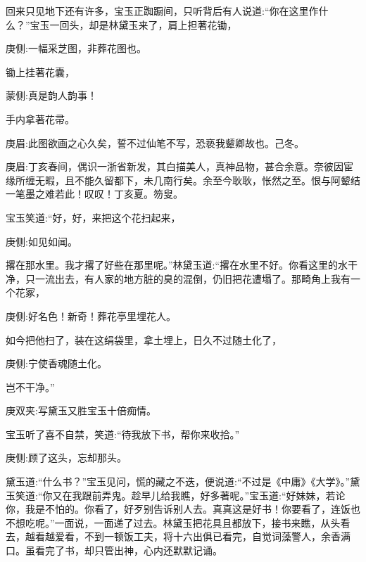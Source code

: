 \begin{parag}
    回来只见地下还有许多，宝玉正踟蹰间，只听背后有人说道:“你在这里作什么？”宝玉一回头，却是林黛玉来了，肩上担著花锄，\begin{note}庚侧:一幅采芝图，非葬花图也。\end{note}锄上挂著花囊，\begin{note}蒙侧:真是韵人韵事！\end{note}手内拿著花帚。\begin{note}庚眉:此图欲画之心久矣，誓不过仙笔不写，恐亵我颦卿故也。己冬。\end{note}\begin{note}庚眉:丁亥春间，偶识一浙省新发，其白描美人，真神品物，甚合余意。奈彼因宦缘所缠无暇，且不能久留都下，未几南行矣。余至今耿耿，怅然之至。恨与阿颦结一笔墨之难若此！叹叹！丁亥夏。笏叟。\end{note}宝玉笑道:“好，好，来把这个花扫起来，\begin{note}庚侧:如见如闻。\end{note}撂在那水里。我才撂了好些在那里呢。”林黛玉道:“撂在水里不好。你看这里的水干净，只一流出去，有人家的地方脏的臭的混倒，仍旧把花遭塌了。那畸角上我有一个花冢，\begin{note}庚侧:好名色！新奇！葬花亭里埋花人。\end{note}如今把他扫了，装在这绢袋里，拿土埋上，日久不过随土化了，\begin{note}庚侧:宁使香魂随土化。\end{note}岂不干净。”\begin{note}庚双夹:写黛玉又胜宝玉十倍痴情。\end{note}宝玉听了喜不自禁，笑道:“待我放下书，帮你来收拾。”\begin{note}庚侧:顾了这头，忘却那头。\end{note}黛玉道:“什么书？”宝玉见问，慌的藏之不迭，便说道:“不过是《中庸》《大学》。”黛玉笑道:“你又在我跟前弄鬼。趁早儿给我瞧，好多著呢。”宝玉道:“好妹妹，若论你，我是不怕的。你看了，好歹别告诉别人去。真真这是好书！你要看了，连饭也不想吃呢。”一面说，一面递了过去。林黛玉把花具且都放下，接书来瞧，从头看去，越看越爱看，不到一顿饭工夫，将十六出俱已看完，自觉词藻警人，余香满口。虽看完了书，却只管出神，心内还默默记诵。
\end{parag}


